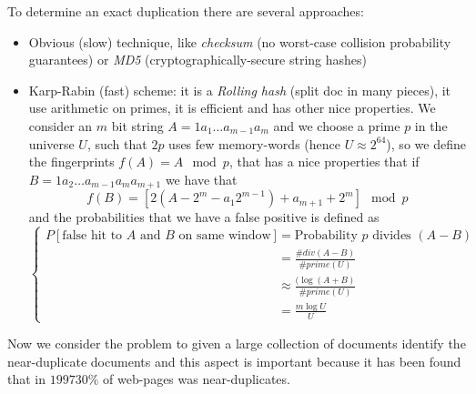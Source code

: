    To determine an exact duplication there are several approaches:
   \begin{itemize}
	\item Obvious (slow) technique, like \emph{checksum} (no worst-case collision probability guarantees) or \emph{MD5} (cryptographically-secure string hashes)
	\item Karp-Rabin (fast) scheme: it is a \emph{Rolling hash} (split doc in many pieces), it use arithmetic on primes, it is efficient and has other nice properties.\newline
	      We consider an $m$ bit string $A = 1 a_1 \dots a_{m-1} a_m$ and we choose a prime $p$ in the universe $U$, such that $2p$ uses few memory-words (hence $U \approx 2^64$),
	      so we define the fingerprints $f(A) = A \mod p$, that has a nice properties that if $B = 1 a_2 \dots a_{m-1} a_m a_{m+1}$ we have that 
	      \[ f(B) = [2(A - 2^m - a_1 2^{m-1}) + a_{m+1} + 2^m] \mod p \]
	      and the probabilities that we have a false positive is defined as 
	      \[ \begin{cases}
		      P[\text{false hit to } A \text{ and } B \text{ on same window}] & = \text{Probability } p \text{ divides } (A - B) \\
		                                                                      & = \frac{\# div(A - B)}{\#prime(U)} \\
										      & \approx \frac{(\log (A + B)}{\# prime(U)} \\
										      & = \frac{m \log U}{U} 
		 \end{cases} \]
    \end{itemize}
    Now we consider the problem to given a large collection of documents identify the near-duplicate documents and this aspect is important because it has been found that
    in $1997 30\%$ of web-pages was near-duplicates.


